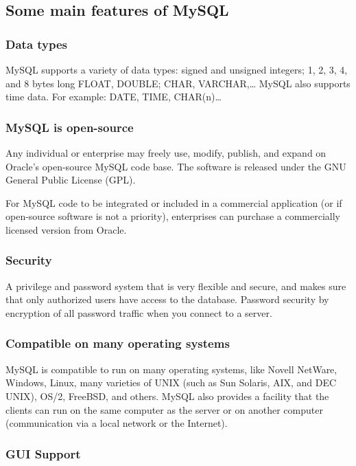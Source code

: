 \documentclass[a4paper]{article}
\numberwithin{equation}{section}
\begin{document}
\subsection{Some main features of MySQL}
\subsubsection{Data types}
MySQL supports a variety of data types: signed and unsigned integers; 1, 2, 3, 4, and 8 bytes long FLOAT, DOUBLE; CHAR, VARCHAR,\dots
MySQL also supports time data.
For example: DATE, TIME, CHAR(n)\dots

\subsubsection{MySQL is open-source}
Any individual or enterprise may freely use, modify, publish, and expand on Oracle’s open-source MySQL code base.
The software is released under the GNU General Public License (GPL).

For MySQL code to be integrated or included in a commercial application (or if open-source software is not a priority), enterprises can purchase a commercially licensed version from Oracle.

\subsubsection{Security}
A privilege and password system that is very flexible and secure, and makes sure that only authorized users have access to the database.
Password security by encryption of all password traffic when you connect to a server.

\subsubsection{Compatible on many operating systems}

MySQL is compatible to run on many operating systems, like Novell NetWare, Windows, Linux, many varieties of UNIX (such as Sun Solaris, AIX, and DEC UNIX), OS/2, FreeBSD, and others. MySQL also provides a facility that the clients can run on the same computer as the server or on another computer (communication via a local network or the Internet).

\subsubsection{GUI Support}
\end{document}
